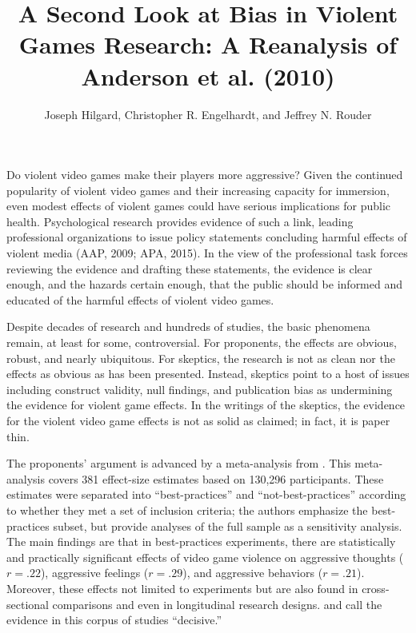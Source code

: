 \documentclass[man]{apa6}
\author{Joseph Hilgard, Christopher R. Engelhardt, and Jeffrey N. Rouder}
\title{A Second Look at Bias in Violent Games Research: A Reanalysis of Anderson et al. (2010)}
\affiliation{University of Missouri}
\begin{document}
\maketitle


Do violent video games make their players more aggressive? Given the continued popularity of violent video games and their increasing capacity for immersion, even modest effects of violent games could have serious implications for public health. Psychological research provides evidence of such a link, leading professional organizations to issue policy statements concluding harmful effects of violent media (AAP, 2009; APA, 2015). In the view of the professional task forces reviewing the evidence and drafting these statements, the evidence is clear enough, and the hazards certain enough, that the public should be informed and educated of the harmful effects of violent video games. \nocite{APA:2015,AAP:2009}

Despite decades of research and hundreds of studies, the basic phenomena remain, at least for some, controversial.  For proponents, the effects are obvious, robust, and nearly ubiquitous. For skeptics, the research is not as clean nor the effects as obvious as has been presented.  Instead, skeptics point to a host of issues including construct validity, null findings, and publication bias as undermining the evidence for violent game effects.  In the writings of the skeptics, the evidence for the violent video game effects is not as solid as claimed; in fact, it is paper thin.

The proponents' argument is advanced by a meta-analysis from \citet{Anderson:etal:2010}.  This meta-analysis covers 381 effect-size estimates based on 130,296 participants.  These estimates were separated into ``best-practices'' and ``not-best-practices'' according to whether they met a set of inclusion criteria; the authors emphasize the best-practices subset, but provide analyses of the full sample as a sensitivity analysis. The main findings are that in best-practices experiments, there are statistically and practically significant effects of video game violence on aggressive thoughts ($r = .22$),  aggressive feelings ($r = .29$), and aggressive behaviors ($r = .21$).  Moreover, these effects not limited to experiments but are also found in cross-sectional comparisons and even in longitudinal research designs. \citet{Bushman:etal:2010} and \citet{Huesmann:2010} call the evidence in this corpus of studies ``decisive.'' 
\end{document}
